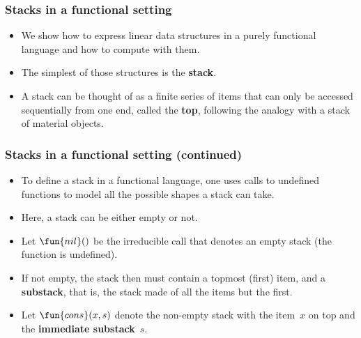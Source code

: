 \documentclass[compress,dvips,xcolor={dvipsnames},t]{beamer}
\begin{document}
\begin{frame}
  \frametitle{Stacks in a functional setting}

  \begin{itemize}

    \item We show how to express linear data structures in a purely
      functional language and how to compute with them.

    \item The simplest of those structures is the \textbf{stack}.

    \item A stack can be thought of as a finite series of items that
      can only be accessed sequentially from one end, called the
      \textbf{top}, following the analogy with a stack of material
      objects.

  \end{itemize}

\end{frame}
\begin{frame}
  \frametitle{Stacks in a functional setting (continued)}

  \begin{itemize}

    \item To define a stack in a functional language, one uses calls
      to undefined functions to model all the possible shapes a stack
      can take.

    \item Here, a stack can be either empty or not.

    \item Let \(\fun{nil}()\) be the irreducible call that denotes an
      empty stack (the function  is undefined).

    \item If not empty, the stack then must contain a topmost (first)
      item, and a \textbf{substack}, that is, the stack made of all
      the items but the first.

    \item Let \(\fun{cons}(x,s)\) denote the non\hyp{}empty stack with
      the item~\(x\) on top and the \textbf{immediate substack}~\(s\).

  \end{itemize}

\end{frame}
\end{document}
